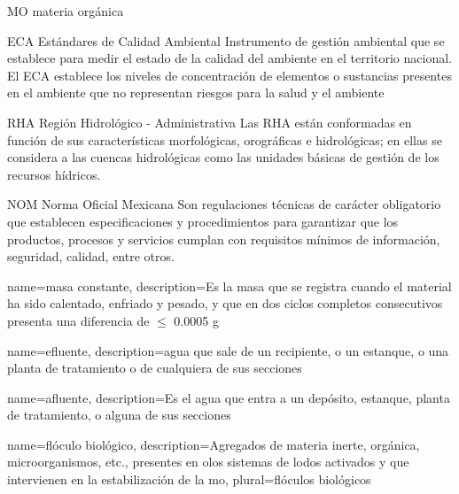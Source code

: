 	{MO}
	{materia orgánica}
	{}

	{ECA}
	{Estándares de Calidad Ambiental}
	{Instrumento de gestión ambiental que se establece para medir el estado de la calidad del ambiente en el territorio nacional. El ECA establece los niveles de concentración de elementos o sustancias presentes en el ambiente que no representan riesgos para la salud y el ambiente}

	{RHA}
	{Región Hidrológico - Administrativa}
	{Las RHA están conformadas en función de sus características morfológicas, orográficas e hidrológicas; en ellas se considera a las cuencas hidrológicas como las unidades básicas de gestión de los recursos hídricos.}
	
	{NOM}
	{Norma Oficial Mexicana}
	{Son regulaciones técnicas de carácter obligatorio que establecen especificaciones y procedimientos para garantizar que los productos, procesos y servicios cumplan con requisitos mínimos de información, seguridad, calidad, entre otros.}

{
	name={masa constante},
	description={Es la masa que se registra cuando el material ha sido calentado, enfriado y pesado, y que en dos ciclos completos consecutivos presenta una diferencia de $\leq$ 0.0005 g}
}

{
	name={efluente},
	description={agua que sale de un recipiente, o un estanque, o una planta de tratamiento o de cualquiera de sus secciones}
}

{
	name=afluente,
	description={Es el agua que entra a un depósito, estanque, planta de tratamiento, o alguna de sus secciones}
}

{
	name={flóculo biológico},
	description={Agregados de materia inerte, orgánica, microorganismos, etc., presentes en olos sistemas de lodos activados y que intervienen en la estabilización de la \gls{mo}},
	plural={flóculos biológicos}
}




